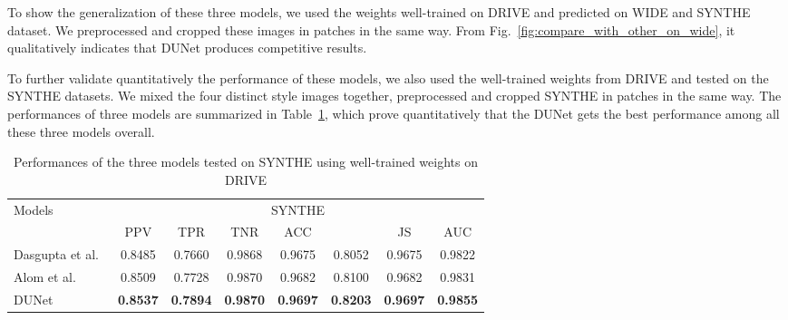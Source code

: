 \documentclass[journal]{IEEEtran}
\begin{document}
To show the generalization of these three models, we used the weights well-trained on DRIVE and predicted on WIDE and SYNTHE dataset. We preprocessed and cropped these images in patches in the same way. From Fig.~\ref{fig:compare_with_other_on_wide}, it qualitatively indicates that DUNet produces competitive results. 

To further validate quantitatively the performance of these models, we also used the well-trained weights from DRIVE and tested on the SYNTHE datasets. We mixed the four distinct style images together, preprocessed and cropped SYNTHE in patches in the same way. The performances of three models are summarized in Table~\ref{table:SYNTHE_performance}, which prove quantitatively that the DUNet gets the best performance among all these three models overall. 

\begin{table}[]
\caption{Performances of the three models tested on SYNTHE using well-trained weights on DRIVE}
\renewcommand\arraystretch{1.3}      
\renewcommand\tabcolsep{1.5pt} 
\begin{center}
\begin{tabular}{lccccccc}
\toprule
\multirow{2}{*}{Models} & \multicolumn{7}{c}{SYNTHE}                                                                                                  \\ \cline{2-8} 
                        & PPV             & TPR             & TNR             & ACC             &               & JS              & AUC             \\ \hline
 Dasgupta et al.~\cite{dasgupta_fully_2017}       & 0.8485          & 0.7660         & 0.9868          & 0.9675          & 0.8052          & 0.9675          & 0.9822          \\ 
Alom et al.~\cite{alom_recurrent_2018}                   & 0.8509 & 0.7728          & 0.9870 & 0.9682          & 0.8100           & 0.9682          & 0.9831          \\
DUNet                   & \textbf{0.8537}          & \textbf{0.7894} & \textbf{0.9870}          & \textbf{0.9697} & \textbf{0.8203} & \textbf{0.9697} & \textbf{0.9855} \\
\bottomrule
\end{tabular}
\end{center}
\label{table:SYNTHE_performance}
\end{table}
\end{document}
